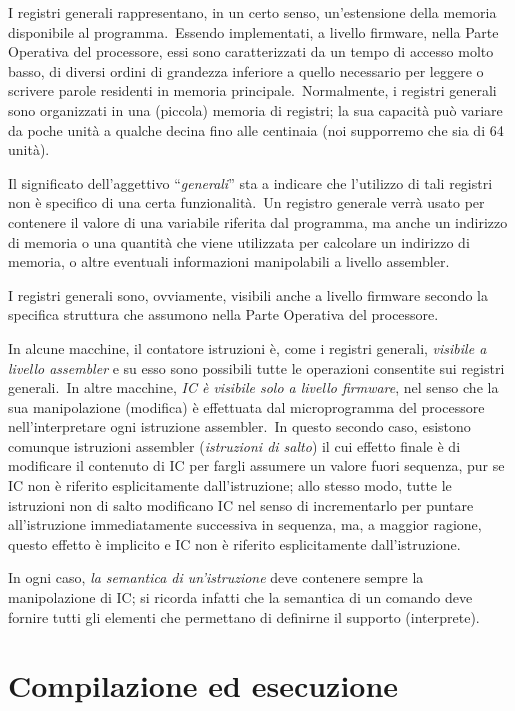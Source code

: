 I registri generali rappresentano, in un certo senso, un'estensione della memoria disponibile al programma.\
Essendo implementati, a livello firmware, nella Parte Operativa del processore, essi sono caratterizzati da un tempo di accesso molto basso, di diversi ordini di grandezza inferiore a quello necessario per leggere o scrivere parole residenti in memoria principale.\
Normalmente, i registri generali sono organizzati in una (piccola) memoria di registri; la sua capacità può variare da poche unità a qualche decina fino alle centinaia (noi supporremo che sia di 64 unità).

Il significato dell'aggettivo ``\textit{generali}'' sta a indicare che l'utilizzo di tali registri non è specifico di una certa funzionalità.\
Un registro generale verrà usato per contenere il valore di una variabile riferita dal programma, ma anche un indirizzo di memoria o una quantità che viene utilizzata per calcolare un indirizzo di memoria, o altre eventuali informazioni manipolabili a livello assembler.

I registri generali sono, ovviamente, visibili anche a livello firmware secondo la specifica struttura che
assumono nella Parte Operativa del processore.

In alcune macchine, il contatore istruzioni è, come i registri generali, \textit{visibile a livello assembler} e su esso sono possibili tutte le operazioni consentite sui registri generali.\
In altre macchine, \textit{IC è visibile solo a livello firmware}, nel senso che la sua manipolazione (modifica) è effettuata dal microprogramma del processore nell'interpretare ogni istruzione assembler.\
In questo secondo caso, esistono comunque istruzioni assembler (\textit{istruzioni di salto}) il cui effetto finale è di modificare il contenuto di IC per fargli assumere un valore fuori sequenza, pur se IC non è riferito esplicitamente dall'istruzione; allo stesso modo, tutte le istruzioni non di salto modificano IC nel senso di incrementarlo per puntare all'istruzione immediatamente successiva in sequenza, ma, a maggior ragione, questo effetto è implicito e IC non è riferito esplicitamente dall'istruzione.

In ogni caso, \textit{la semantica di un'istruzione} deve contenere sempre la manipolazione di IC; si ricorda infatti che la semantica di un comando deve fornire tutti gli elementi che permettano di definirne il supporto (interprete).

\section{Compilazione ed esecuzione}

